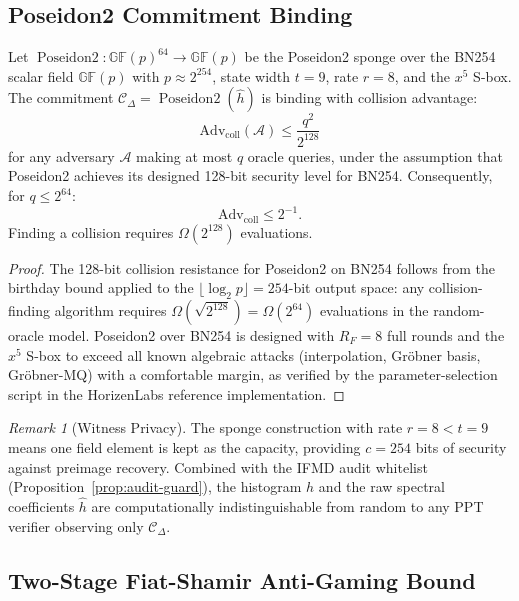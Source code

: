 \documentclass[12pt,letterpaper]{article}
\theoremstyle{definition}
\theoremstyle{plain}
\theoremstyle{remark}
\newtheorem*{remark}{Remark}
\newcommand{\Poseidon}{\operatorname{Poseidon2}}
\newcommand{\hhat}{\hat{h}}
\newcommand{\GFp}{\mathbb{GF}(p)}
\begin{document}
\subsection{Poseidon2 Commitment Binding}

\begin{proposition}
\label{prop:poseidon-cr}
Let $\Poseidon : \GFp^{64} \to \GFp$ be the Poseidon2 sponge over the
BN254 scalar field $\GFp$ with $p \approx 2^{254}$, state width $t=9$,
rate $r=8$, and the $x^5$ S-box.  The commitment
$\mathcal{C}_\Delta = \Poseidon(\hhat)$ is binding with collision advantage:
\[
  \mathrm{Adv}_{\mathrm{coll}}(\mathcal{A}) \le \frac{q^2}{2^{128}}
\]
for any adversary $\mathcal{A}$ making at most $q$ oracle queries, under
the assumption that Poseidon2 achieves its designed 128-bit security level
for BN254.  Consequently, for $q \le 2^{64}$:
\[
  \mathrm{Adv}_{\mathrm{coll}} \le 2^{-1}.
\]
Finding a collision requires $\Omega(2^{128})$ evaluations.
\end{proposition}

\begin{proof}
The 128-bit collision resistance for Poseidon2 on BN254 follows from the
birthday bound applied to the $\lfloor\log_2 p\rfloor = 254$-bit
output space: any collision-finding algorithm requires
$\Omega(\sqrt{2^{128}}) = \Omega(2^{64})$ evaluations in the random-oracle
model.  Poseidon2 over BN254 is designed with $R_F = 8$ full rounds and
the $x^5$ S-box to exceed all known algebraic attacks
(interpolation, Gr\"obner basis, Gr\"obner-MQ) with a comfortable margin,
as verified by the parameter-selection script in the HorizenLabs reference
implementation.
\end{proof}

\begin{remark}[Witness Privacy]
The sponge construction with rate $r=8 < t=9$ means one field element
is kept as the capacity, providing $c = 254$ bits of security against
preimage recovery.  Combined with the IFMD audit whitelist
(Proposition~\ref{prop:audit-guard}), the histogram $h$ and the raw
spectral coefficients $\hhat$ are computationally indistinguishable
from random to any PPT verifier observing only $\mathcal{C}_\Delta$.
\end{remark}

\subsection{Two-Stage Fiat-Shamir Anti-Gaming Bound}
\end{document}
